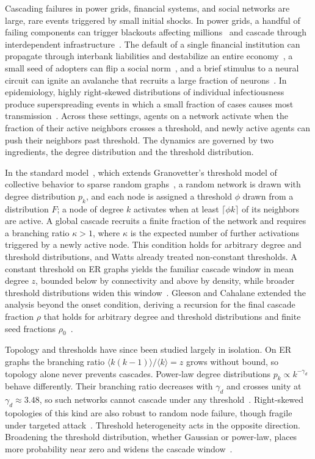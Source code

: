 \documentclass[]{revtex4-2}
\begin{document}
Cascading failures in power grids, financial systems, and social networks are large, rare events triggered by small initial shocks. In power grids, a handful of failing components can trigger blackouts affecting millions~\citep{MotterLai2002, Yang2017} and cascade through interdependent infrastructure~\citep{Brummitt2012}. The default of a single financial institution can propagate through interbank liabilities and destabilize an entire economy~\citep{GaiKapadia2010}, a small seed of adopters can flip a social norm~\citep{Centola2010}, and a brief stimulus to a neural circuit can ignite an avalanche that recruits a large fraction of neurons~\citep{BeggsPlenz2003, ShewPlenz2013}. In epidemiology, highly right-skewed distributions of individual infectiousness produce superspreading events in which a small fraction of cases causes most transmission~\citep{LloydSmith2005}. Across these settings, agents on a network activate when the fraction of their active neighbors crosses a threshold, and newly active agents can push their neighbors past threshold. The dynamics are governed by two ingredients, the degree distribution and the threshold distribution.

In the standard model~\citep{Watts2002}, which extends Granovetter's threshold model of collective behavior to sparse random graphs~\citep{Granovetter1978}, a random network is drawn with degree distribution $p_k$, and each node is assigned a threshold $\phi$ drawn from a distribution $F$; a node of degree $k$ activates when at least $\lceil\phi k\rceil$ of its neighbors are active. A global cascade recruits a finite fraction of the network and requires a branching ratio $\kappa>1$, where $\kappa$ is the expected number of further activations triggered by a newly active node. This condition holds for arbitrary degree and threshold distributions, and Watts already treated non-constant thresholds. A constant threshold on ER graphs yields the familiar cascade window in mean degree $z$, bounded below by connectivity and above by density, while broader threshold distributions widen this window~\citep{Watts2002}. Gleeson and Cahalane extended the analysis beyond the onset condition, deriving a recursion for the final cascade fraction $\rho$ that holds for arbitrary degree and threshold distributions and finite seed fractions $\rho_0$~\citep{GleesonCahalane2007}.

Topology and thresholds have since been studied largely in isolation. On ER graphs the branching ratio $\langle k(k-1)\rangle/\langle k\rangle = z$ grows without bound, so topology alone never prevents cascades. Power-law degree distributions $p_k \propto k^{-\gamma_d}$ behave differently. Their branching ratio decreases with $\gamma_d$ and crosses unity at $\gamma_d \approx 3.48$, so such networks cannot cascade under any threshold~\citep{AielloChungLu2000}. Right-skewed topologies of this kind are also robust to random node failure, though fragile under targeted attack~\citep{Albert2000}. Threshold heterogeneity acts in the opposite direction. Broadening the threshold distribution, whether Gaussian or power-law, places more probability near zero and widens the cascade window~\citep{Watts2002, GleesonCahalane2007}.
\end{document}
